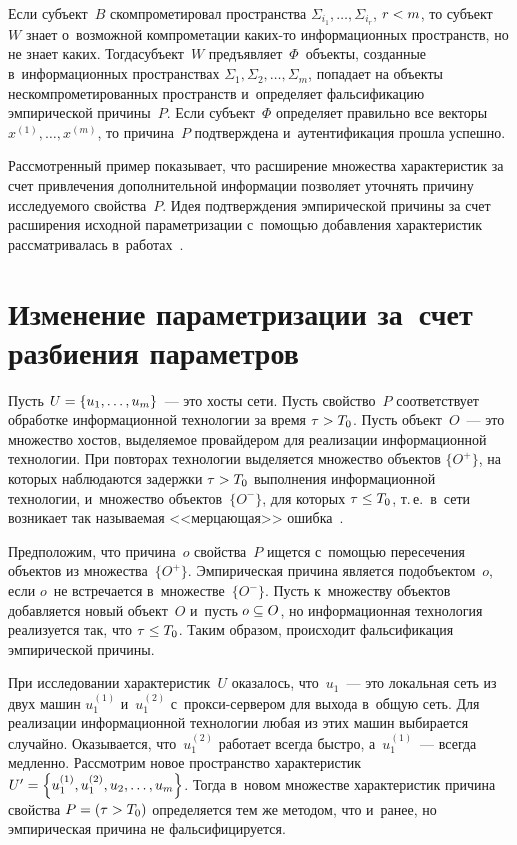 \begin{multicols}{2}
  Если субъект~$B$ скомпрометировал пространства $\Sigma_{i_1}, \ldots , 
\Sigma_{i_r}$, $r\hm<m$, то субъект~$W$ знает о~возможной компрометации  
ка\-ких-то информа\-ци\-онных пространств, но не знает каких. Тогда\linebreak субъект~$W$ 
предъявляет~$\Phi$~объекты, созданные\linebreak
 в~информационных пространствах 
$\Sigma_1, \Sigma_2, \ldots ,\Sigma_m$, попадает на объекты 
нескомпрометированных пространств и~определяет фальсификацию 
эмпирической причины~$P$. Если субъект~$\Phi$ определяет правильно все 
векторы $x^{(1)}, \ldots , x^{(m)}$, то причина~$P$ подтверждена 
и~аутентификация прошла успешно.
  
  Рассмотренный пример показывает, что расширение множества характеристик 
за счет привлечения дополнительной информации позволяет уточнять причину 
исследуемого свойства~$P$. Идея подтвержде\-ния эмпирической причины за счет 
расширения исходной параметризации с~помощью добавления характеристик 
рассматривалась в~работах~\cite{6-gr, 7-gr}.
  
\section{Изменение параметризации за~счет разбиения параметров}
   
   Пусть $U\hm=\{u_1, \ldots , u_m\}$~--- это хосты сети. Пусть свойство~$P$ 
соответствует обработке информационной технологии за время $\tau\hm> T_0$. 
Пусть объект~$O$~--- это множество хостов, выделяемое провайдером для 
реализации информационной технологии. При повторах технологии выделяется 
множество объектов $\{O^+\}$, на которых наблюдаются задержки $\tau\hm > 
T_0$ выполнения информационной технологии, и~множество объектов~$\{O^-\}$, 
для которых $\tau\hm\leq T_0$, т.\,е.\ в~сети возникает так называемая 
<<мерцающая>> ошибка~\cite{8-gr, 9-gr}.
   
   Предположим, что причина~$o$ свойства~$P$ ищется с~помощью пересечения 
объектов из множества~$\{O^+\}$. Эмпирическая причина является подобъектом~$o$, 
если $o$~не встречается в~множестве~$\{O^-\}$. Пусть к~множеству объектов 
добавляется новый объект~$O$ и~пусть $o\hm\subseteq O$, но информационная 
технология реализуется так, что $\tau\hm\leq T_0$. Таким образом, происходит 
фальсификация эмпирической при\-чины.
   
   При исследовании характеристик~$U$ оказалось, что~$u_1$~--- это 
локальная сеть из двух машин $u_1^{(1)}$ и~$u_1^{(2)}$ с~прок\-си-сер\-ве\-ром 
для выхода в~общую сеть. Для реализации информационной технологии любая из 
этих машин выбирается случайно. Оказывается, что~$u_1^{(2)}$ работает всегда 
быстро, а~$u_1^{(1)}$~--- всегда медленно. Рассмотрим новое пространство 
характеристик $U^\prime\hm= \left\{ u_1^{(1)}, u_1^{(2)}, u_2, \ldots , u_m\right\}$. 
Тогда в~новом множестве характеристик причина свойства $P\hm= (\tau\hm > 
T_0)$ определяется тем же методом, что и~ранее, но эмпирическая причина не 
фальсифицируется.


\end{multicols}
